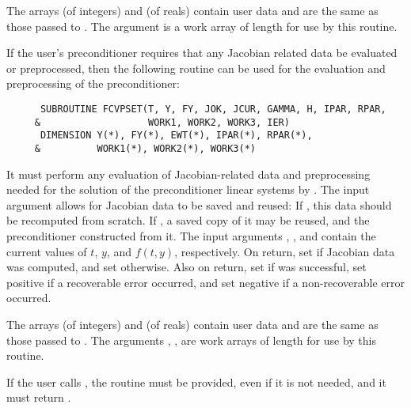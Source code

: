 \begin{Steps}
  The arrays  (of integers) and  (of reals) contain user data
  and are the same as those passed to .
  The argument  is a work array of length  for use by this
  routine.

  If the user's preconditioner requires that any Jacobian related data be evaluated
  or preprocessed, then the following routine can be used for the evaluation and 
  preprocessing of the preconditioner:
\begin{verbatim}
      SUBROUTINE FCVPSET(T, Y, FY, JOK, JCUR, GAMMA, H, IPAR, RPAR,
     &                   WORK1, WORK2, WORK3, IER)
      DIMENSION Y(*), FY(*), EWT(*), IPAR(*), RPAR(*), 
     &          WORK1(*), WORK2(*), WORK3(*) 
\end{verbatim}
  It must perform any evaluation of Jacobian-related data and preprocessing needed
  for the solution of the preconditioner linear systems by .
  The input argument  allows for Jacobian data to be saved and reused:
  If , this data should be recomputed from scratch. If ,
  a saved copy of it may be reused, and the preconditioner constructed from it.
  The input arguments , , and  contain the current
  values of $t$, $y$, and $f(t,y)$, respectively.
  On return, set  if Jacobian data was computed, and set
   otherwise.
  Also on return, set  if  was successful, set 
  positive if a recoverable error occurred, and set  negative if a 
  non-recoverable error occurred.
  
  The arrays  (of integers) and  (of reals) contain user data
  and are the same as those passed to .
  The arguments , ,  are work arrays of length 
   for use by this routine.

  {\warn}If the user calls , the routine  must
  be provided, even if it is not needed, and it must return .


\end{Steps}
